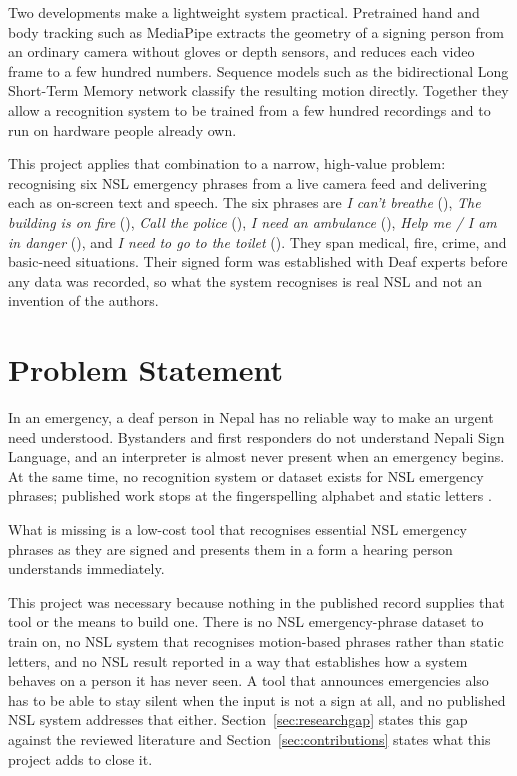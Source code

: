 \noindent Two developments make a lightweight system practical. Pretrained hand and body tracking such as MediaPipe \cite{zhang2020mediapipe} extracts the geometry of a signing person from an ordinary camera without gloves or depth sensors, and reduces each video frame to a few hundred numbers. Sequence models such as the bidirectional Long Short-Term Memory network \cite{hochreiter1997lstm, graves2005bilstm} classify the resulting motion directly. Together they allow a recognition system to be trained from a few hundred recordings and to run on hardware people already own.

\noindent This project applies that combination to a narrow, high-value problem: recognising six NSL emergency phrases from a live camera feed and delivering each as on-screen text and speech. The six phrases are \textit{I can't breathe} (), \textit{The building is on fire} (), \textit{Call the police} (), \textit{I need an ambulance} (), \textit{Help me / I am in danger} (), and \textit{I need to go to the toilet} (). They span medical, fire, crime, and basic-need situations. Their signed form was established with Deaf experts before any data was recorded, so what the system recognises is real NSL and not an invention of the authors.

\section{Problem Statement}

In an emergency, a deaf person in Nepal has no reliable way to make an urgent need understood. Bystanders and first responders do not understand Nepali Sign Language, and an interpreter is almost never present when an emergency begins. At the same time, no recognition system or dataset exists for NSL emergency phrases; published work stops at the fingerspelling alphabet and static letters \cite{sunuwar2024nsl23, shrestha2024nsl, poudel2025nsl}.

\noindent What is missing is a low-cost tool that recognises essential NSL emergency phrases as they are signed and presents them in a form a hearing person understands immediately.

\noindent This project was necessary because nothing in the published record supplies that tool or the means to build one. There is no NSL emergency-phrase dataset to train on, no NSL system that recognises motion-based phrases rather than static letters, and no NSL result reported in a way that establishes how a system behaves on a person it has never seen. A tool that announces emergencies also has to be able to stay silent when the input is not a sign at all, and no published NSL system addresses that either. Section~\ref{sec:researchgap} states this gap against the reviewed literature and Section~\ref{sec:contributions} states what this project adds to close it.

